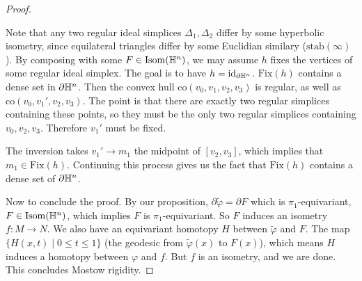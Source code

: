 \begin{proof}
\begin{prop}
\end{prop}
Note that any two regular ideal simplices $\Delta_1,\Delta_2 $ differ by some hyperbolic isometry, since equilateral triangles differ by some Euclidian similary ($\mathrm{stab}(\infty)$). By composing with some $F \in \mathrm{Isom}(\mathbb{H}^n )$, we may assume $h$ fixes the vertices of some regular ideal simplex. The goal is to have $h=\operatorname{id} _{\partial \mathbb{H}^n }$. $\mathrm{Fix}(h)$ contains a dense set in $\partial \mathbb{H}^n $. Then the convex hull $\mathrm{co}(v_0,v_1,v_2,v_3)$ is regular, as well as $\mathrm{co}(v_0,v_1',v_2,v_3)$. The point is that there are exactly two regular simplices containing these points, so they must be the only two regular simplices containing $v_0,v_2,v_3$. Therefore $v_1'$ must be fixed.

The inversion takes $v_1' \to  m_1$ the midpoint of $[v_2,v_3]$, which implies that $m_1 \in \mathrm{Fix}(h)$. Continuing this process gives us the fact that $\mathrm{Fix}(h) $ contains a dense set of $\partial \mathbb{H}^n $.

Now to conclude the proof. By our proposition, $\partial  \widetilde \varphi  = \partial F$ which is $\pi_1$-equivariant, $F \in \mathrm{Isom}(\mathbb{H}^n )$, which implies $F$ is $\pi_1$-equivariant. So $F$ induces an isometry $f \colon M \to N$. We also have an equivariant homotopy $H$ between $\widetilde \varphi $ and $F$. The map $\{H(x,t) \mid 0 \leq t \leq 1\} $ (the geodesic from $\widetilde  \varphi (x)$ to $F(x)$), which means $H$ induces a homotopy between $\varphi $ and $f$. But $f$ is an isometry, and we are done. This concludes Mostow rigidity.
\end{proof}
